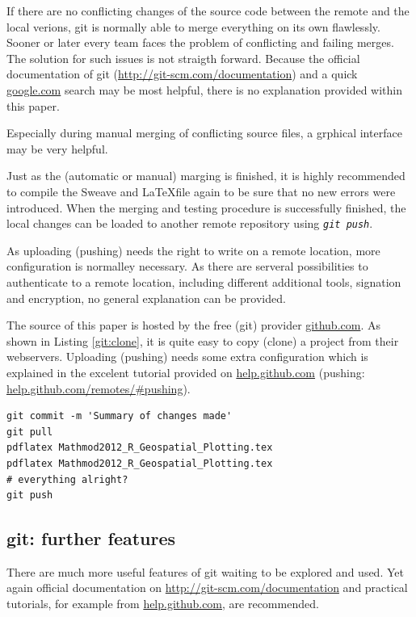 \documentclass{ifacconf}
\begin{document}
If there are no conflicting changes of the source code between the remote and the local
verions, git is normally able to merge everything on its own flawlessly. Sooner or later every team
faces the problem of conflicting and failing merges. The solution for such issues is not straigth forward.
Because the official documentation of git (\url{http://git-scm.com/documentation}) and a quick 
\url{google.com} search may be most helpful, there is no explanation provided within this paper.

Especially during manual merging of conflicting source files, a grphical interface may be very helpful.

Just as the (automatic or manual) marging is finished, it is highly recommended to compile 
the Sweave and \LaTeX file again to be sure that no new errors were introduced. When the merging and
testing procedure is successfully finished, the local changes can be loaded to another remote repository
using \textit{\lstinline!git push!}.

As uploading (pushing) needs the right to write on a remote location, more configuration is normalley 
necessary. As there are serveral possibilities to authenticate to a remote location, 
including different additional tools, signation and encryption, no general explanation can be provided.

The source of this paper is hosted by the free (git) provider \url{github.com}. As shown in 
Listing \ref{git:clone}, it is quite easy to copy (clone) a project from their webservers. 
Uploading (pushing) needs some extra configuration which is explained in the excelent tutorial
provided on \url{help.github.com} (pushing: \url{help.github.com/remotes/#pushing}).

\begin{lstlisting}
git commit -m 'Summary of changes made'
git pull
pdflatex Mathmod2012_R_Geospatial_Plotting.tex
pdflatex Mathmod2012_R_Geospatial_Plotting.tex
# everything alright?
git push
\end{lstlisting}

\subsection{git: further features}
There are much more useful features of git waiting to be explored and used. Yet again
official documentation on \url{http://git-scm.com/documentation} and practical
tutorials, for example from \url{help.github.com}, are recommended.
\end{document}

